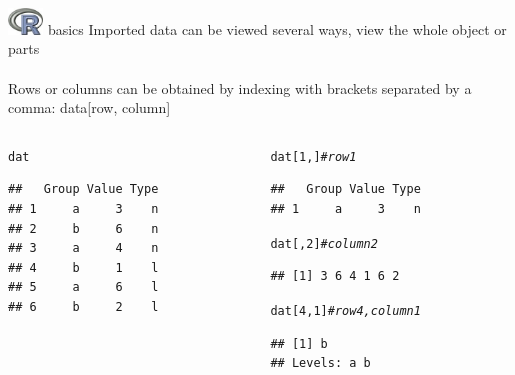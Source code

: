 \documentclass[xcolor=svgnames]{beamer}\usepackage[]{graphicx}\usepackage[]{color}
\makeatletter
\newcommand{\hlnum}[1]{\textcolor[rgb]{0.686,0.059,0.569}{#1}}%
\newcommand{\hlcom}[1]{\textcolor[rgb]{0.678,0.584,0.686}{\textit{#1}}}%
\newcommand{\hlstd}[1]{\textcolor[rgb]{0.345,0.345,0.345}{#1}}%
\newenvironment{kframe}{%
 \def\at@end@of@kframe{}%
 \ifinner\ifhmode%
  \def\at@end@of@kframe{\end{minipage}}%
  \begin{minipage}{\columnwidth}%
 \fi\fi%
 \def\FrameCommand##1{\hskip\@totalleftmargin \hskip-\fboxsep
 \colorbox{shadecolor}{##1}\hskip-\fboxsep
     \hskip-\linewidth \hskip-\@totalleftmargin \hskip\columnwidth}%
 \MakeFramed {\advance\hsize-\width
   \@totalleftmargin\z@ \linewidth\hsize
   \@setminipage}}%
 {\par\unskip\endMakeFramed%
 \at@end@of@kframe}
\newenvironment{knitrout}{}{} %
\makeatother
\begin{document}
\begin{frame}{\includegraphics[width=0.07\textwidth]{Rlogo.jpg} \hspace{0.01in} basics}
Imported data can be viewed several ways, view the whole object or parts \\~\\
Rows or columns can be obtained by indexing with brackets separated by a comma: data[row, column]
\vspace{-0.3in}
\begin{columns}[t]
\begin{column}{0.45\textwidth}
\begin{knitrout}\scriptsize
{}\color{fgcolor}\begin{kframe}
\begin{alltt}
\hlstd{dat}
\end{alltt}
\begin{verbatim}
##   Group Value Type
## 1     a     3    n
## 2     b     6    n
## 3     a     4    n
## 4     b     1    l
## 5     a     6    l
## 6     b     2    l
\end{verbatim}
\end{kframe}
\end{knitrout}
\end{column}

\begin{column}{0.45\textwidth}
\begin{knitrout}\scriptsize
{}\color{fgcolor}\begin{kframe}
\begin{alltt}
\hlstd{dat[}\hlnum{1}\hlstd{, ]} \hlcom{# row 1}
\end{alltt}
\begin{verbatim}
##   Group Value Type
## 1     a     3    n
\end{verbatim}
\begin{alltt}
\hlstd{dat[,} \hlnum{2}\hlstd{]} \hlcom{# column 2}
\end{alltt}
\begin{verbatim}
## [1] 3 6 4 1 6 2
\end{verbatim}
\begin{alltt}
\hlstd{dat[}\hlnum{4}\hlstd{,} \hlnum{1}\hlstd{]} \hlcom{# row 4, column 1}
\end{alltt}
\begin{verbatim}
## [1] b
## Levels: a b
\end{verbatim}
\end{kframe}
\end{knitrout}
\end{column}
\end{columns}
\end{frame}
\end{document}
